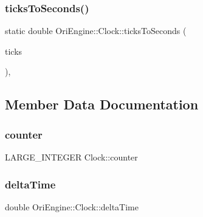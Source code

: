 \hypertarget{class_ori_engine_1_1_clock_af05b430c26528f81d4c0ea530bfc3710}{}\label{class_ori_engine_1_1_clock_af05b430c26528f81d4c0ea530bfc3710} 
\subsubsection{\texorpdfstring{ticks\+To\+Seconds()}{ticksToSeconds()}}
{\footnotesize\ttfamily static double Ori\+Engine\+::\+Clock\+::ticks\+To\+Seconds (\begin{DoxyParamCaption}\item[{L\+A\+R\+G\+E\+\_\+\+I\+N\+T\+E\+G\+ER}]{ticks }\end{DoxyParamCaption})\hspace{0.3cm}{\ttfamily [inline]}, {\ttfamily [static]}}



\subsection{Member Data Documentation}
\hypertarget{class_ori_engine_1_1_clock_abe3180bfe2b7ae463f5ee6ce0e21e7c1}{}\label{class_ori_engine_1_1_clock_abe3180bfe2b7ae463f5ee6ce0e21e7c1} 
\subsubsection{\texorpdfstring{counter}{counter}}
{\footnotesize\ttfamily L\+A\+R\+G\+E\+\_\+\+I\+N\+T\+E\+G\+ER Clock\+::counter\hspace{0.3cm}{\ttfamily [static]}}

\hypertarget{class_ori_engine_1_1_clock_afd164eb5b041271fe67e2c85ffb4c455}{}\label{class_ori_engine_1_1_clock_afd164eb5b041271fe67e2c85ffb4c455} 
\subsubsection{\texorpdfstring{delta\+Time}{deltaTime}}
{\footnotesize\ttfamily double Ori\+Engine\+::\+Clock\+::delta\+Time\hspace{0.3cm}{\ttfamily [static]}}

